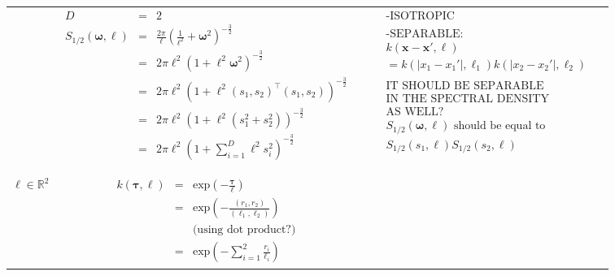 \documentclass[onecolumn,a4paper,11pt]{article}
\begin{document}
\begin{landscape}
\begin{table}[H]
\begin{center}
\begin{tabular}{|c|c|c|c|}
       & \multicolumn{1}{|p{9.7cm}|}{\small
         \begin{eqnarray*}
		D &=& 2\\
		S_{1/2}(\bm{\omega},\ell) &=& \frac{2\pi}{\ell}\left(\frac{1}{\ell^2}+\bm{\omega}^2 \right)^{-\frac{3}{2}} \\
		&=& 2\pi\ell^2\left(1+\ell^2\bm{\omega}^2\right)^{-\frac{3}{2}} \\
		&=& 2\pi\ell^2\left(1+\ell^2(s_{1},s_{2})^\top(s_{1},s_{2})\right)^{-\frac{3}{2}} \\
		&=& 2\pi\ell^2\left(1+\ell^2(s_{1}^2+s_{2}^2)\right)^{-\frac{3}{2}} \\
		&=& 2\pi\ell^2\left(1+\sum_{i=1}^{D}\ell^2s_{i}^2\right)^{-\frac{3}{2}} \\
         \end{eqnarray*}
       }
       
       & \multicolumn{1}{|p{5.7cm}|}{\small
         \begin{eqnarray*}
        &&\text{-ISOTROPIC}\\
        \\
		&&\text{-SEPARABLE:} \\
		&&k(\bm{x}-\bm{x}',\bm{\ell})\\
		 &&= k(|x_1-x_1'|,\ell_1)k(|x_2-x_2'|,\ell_2)\\
		 \\
		 &&\text{IT SHOULD BE SEPARABLE}\\
		 &&\text{IN THE SPECTRAL DENSITY} \\
		 &&\text{AS WELL?}\\
		&&S_{1/2}(\bm{\omega},\ell) \text{ should be equal to }\\
		 &&S_{1/2}(s_1,\ell)S_{1/2}(s_2,\ell)
         \end{eqnarray*}
       }\\
       \vspace{-10mm}\\
        \cline{1-3}
         
       \multicolumn{1}{|p{1.5cm}|}{
       \vspace{1mm}
       $\bm{\ell} \in \mathbb{R}^2$
       }
       
         & \multicolumn{1}{|p{5.7cm}|}{\small
         \begin{eqnarray*}
		k(\bm{\tau},\bm{\ell}) &=& \mathrm{exp}\left(- \frac{\bm{\tau}}{\bm{\ell}} \right) \\
		&=& \mathrm{exp}\left(- \frac{(r_1, r_2)}{(\ell_1,\ell_2)} \right)\\
		&&\text{(using dot product?)}\\
		&=& \mathrm{exp}\left(- \sum_{i=1}^{2}\frac{r_i}{\ell_i} \right) 
         \end{eqnarray*}
       }
       

\end{tabular}
\end{center}
\end{table}
\end{landscape}
\end{document}
